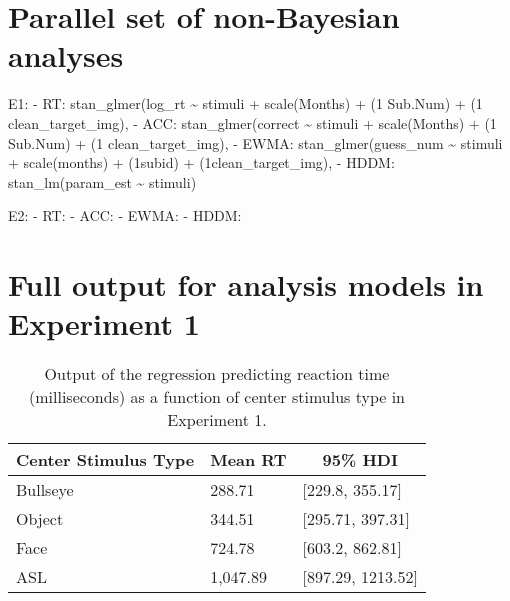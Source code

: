 \documentclass[,man,floatsintext]{apa6}
\begin{document}
\begin{appendix}
\hypertarget{parallel-set-of-non-bayesian-analyses}{%
\section{Parallel set of non-Bayesian
analyses}\label{parallel-set-of-non-bayesian-analyses}}

E1: - RT: stan\_glmer(log\_rt \textasciitilde{} stimuli + scale(Months)
+ (1 \textbar{} Sub.Num) + (1 \textbar{} clean\_target\_img), - ACC:
stan\_glmer(correct \textasciitilde{} stimuli + scale(Months) + (1
\textbar{} Sub.Num) + (1 \textbar{} clean\_target\_img), - EWMA:
stan\_glmer(guess\_num \textasciitilde{} stimuli + scale(months) +
(1\textbar{}subid) + (1\textbar{}clean\_target\_img), - HDDM:
stan\_lm(param\_est \textasciitilde{} stimuli)

E2: - RT: - ACC: - EWMA: - HDDM:

\hypertarget{full-output-for-analysis-models-in-experiment-1}{%
\section{Full output for analysis models in Experiment
1}\label{full-output-for-analysis-models-in-experiment-1}}

\begin{table}[h]
\begin{center}
\begin{threeparttable}
\caption{\label{tab:trio-rt-model}Output of the regression predicting reaction time (milliseconds) as a function of center stimulus type in Experiment 1.}
\begin{tabular}{lll}
\toprule
Center Stimulus Type & \multicolumn{1}{c}{Mean RT} & \multicolumn{1}{c}{95\% HDI}\\
\midrule
Bullseye & 288.71 & [229.8, 355.17]\\
Object & 344.51 & [295.71, 397.31]\\
Face & 724.78 & [603.2, 862.81]\\
ASL & 1,047.89 & [897.29, 1213.52]\\
\bottomrule
\end{tabular}
\end{threeparttable}
\end{center}
\end{table}


\end{appendix}
\end{document}
